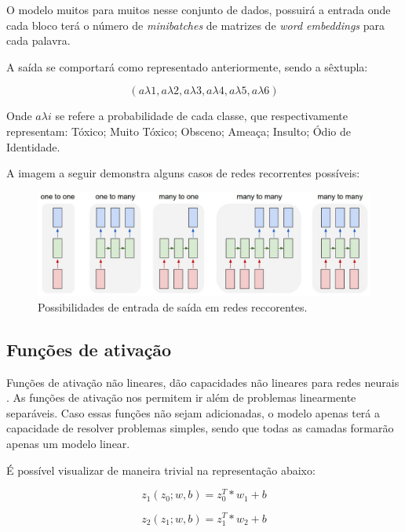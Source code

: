 \documentclass[12pt]{article}
\begin{document}
O modelo muitos para muitos nesse conjunto de dados, possuirá a entrada onde cada bloco terá o número de \textit{minibatches} de matrizes de \textit{word embeddings} para cada palavra.

A saída se comportará como representado anteriormente, sendo a sêxtupla:

\[
(a\lambda1, a\lambda2, a\lambda3, a\lambda4, a\lambda5, a\lambda6)
\]

Onde $a \lambda i$ se refere a probabilidade de cada classe, que respectivamente representam: Tóxico; Muito Tóxico; Obsceno; Ameaça; Insulto; Ódio de Identidade.

A imagem a seguir demonstra alguns casos de redes recorrentes possíveis:

\begin{figure}[!htb]
\centering
\includegraphics[width=1\textwidth]{images/rnn-effectiveness-examples.jpeg}
\caption{
    Possibilidades de entrada de saída em redes reccorentes. \cite{karpathy:2015}
}
\label{fig:sigmoid}
\end{figure}

\subsection{Funções de ativação}

Funções de ativação não lineares, dão capacidades não lineares para redes neurais \cite{lecun:98}. As funções de ativação nos permitem ir além de problemas linearmente separáveis. Caso essas funções não sejam adicionadas, o modelo apenas terá a capacidade de resolver problemas simples, sendo que todas as camadas formarão apenas um modelo linear.

É possível visualizar de maneira trivial na representação abaixo:

\begin{equation}
    z_1(z_0; w, b) = z_0^T * w_1 + b
\end{equation}

\begin{equation}
    z_2(z_1; w, b) = z_1^T * w_2 + b
\end{equation}
\end{document}

